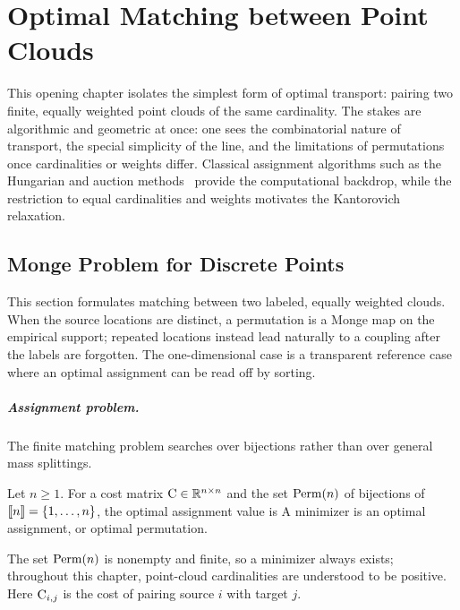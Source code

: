 
\chapter{Optimal Matching between Point Clouds}
\label{sec-matching}

This opening chapter isolates the simplest form of optimal transport: pairing two finite, equally weighted point clouds of the same cardinality. The stakes are algorithmic and geometric at once: one sees the combinatorial nature of transport, the special simplicity of the line, and the limitations of permutations once cardinalities or weights differ. Classical assignment algorithms such as the Hungarian and auction methods~\cite{Kuhn1955,bertsekas1992auction} provide the computational backdrop, while the restriction to equal cardinalities and weights motivates the Kantorovich relaxation.

\section{Monge Problem for Discrete Points}
\label{sec-monge-pbm}

This section formulates matching between two labeled, equally weighted clouds. When the source locations are distinct, a permutation is a Monge map on the empirical support; repeated locations instead lead naturally to a coupling after the labels are forgotten. The one-dimensional case is a transparent reference case where an optimal assignment can be read off by sorting.

\paragraph{Assignment problem.}

The finite matching problem searches over bijections rather than over general mass splittings.
\begin{defn}\label{def-optimal-assignment}
Let $n\geq1$. For a cost matrix $\mathrm{C}\in\mathbb{R}^{n\times n}$ and the set $\mathrm{Perm}(n)$ of bijections of $\llbracket n\rrbracket=\{1,\ldots,n\}$, the optimal assignment value is
	A minimizer is an optimal assignment, or optimal permutation.
\end{defn}
The set $\mathrm{Perm}(n)$ is nonempty and finite, so a minimizer always exists; throughout this chapter, point-cloud cardinalities are understood to be positive. Here $\mathrm{C}_{i,j}$ is the cost of pairing source $i$ with target $j$.

